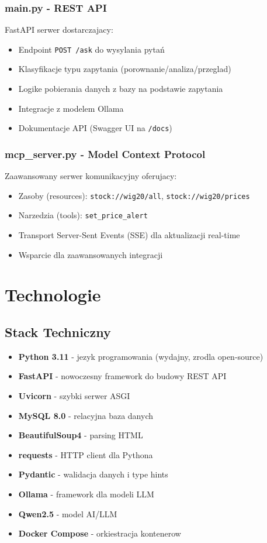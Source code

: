 \documentclass[11pt,a4paper]{article}
\begin{document}
\subsubsection{main.py - REST API}

FastAPI serwer dostarczajacy:
\begin{itemize}
    \item Endpoint \texttt{POST /ask} do wysylania pytań
    \item Klasyfikacje typu zapytania (porownanie/analiza/przeglad)
    \item Logike pobierania danych z bazy na podstawie zapytania
    \item Integracje z modelem Ollama
    \item Dokumentacje API (Swagger UI na \texttt{/docs})
\end{itemize}

\subsubsection{mcp\_server.py - Model Context Protocol}

Zaawansowany serwer komunikacyjny oferujacy:
\begin{itemize}
    \item Zasoby (resources): \texttt{stock://wig20/all}, \texttt{stock://wig20/prices}
    \item Narzedzia (tools): \texttt{set\_price\_alert}
    \item Transport Server-Sent Events (SSE) dla aktualizacji real-time
    \item Wsparcie dla zaawansowanych integracji
\end{itemize}

\section{Technologie}

\subsection{Stack Techniczny}

\begin{itemize}
    \item \textbf{Python 3.11} - jezyk programowania (wydajny, zrodla open-source)
    \item \textbf{FastAPI} - nowoczesny framework do budowy REST API
    \item \textbf{Uvicorn} - szybki serwer ASGI
    \item \textbf{MySQL 8.0} - relacyjna baza danych
    \item \textbf{BeautifulSoup4} - parsing HTML
    \item \textbf{requests} - HTTP client dla Pythona
    \item \textbf{Pydantic} - walidacja danych i type hints
    \item \textbf{Ollama} - framework dla modeli LLM
    \item \textbf{Qwen2.5} - model AI/LLM
    \item \textbf{Docker Compose} - orkiestracja kontenerow
\end{itemize}
\end{document}
